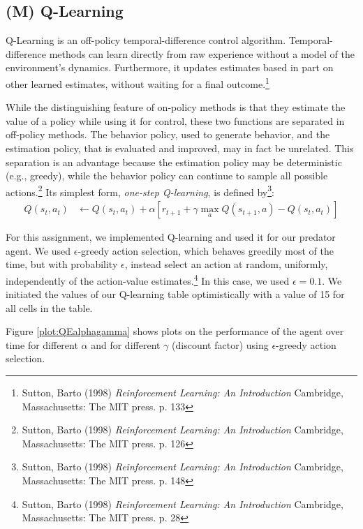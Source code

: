 \documentclass{article}
\begin{document}
\subsection{(M) Q-Learning}\label{sec:exercise1}
Q-Learning is an off-policy temporal-difference control algorithm. Temporal-difference methods can learn directly from raw experience without a model of the environment's dynamics. Furthermore, it updates estimates based in part on other learned estimates, without waiting for a final outcome.\footnote{Sutton, Barto (1998) \textit{Reinforcement Learning: An Introduction} Cambridge, Massachusetts: The MIT press. p. 133}

While the distinguishing feature of on-policy methods is that they estimate the value of a policy while using it for control, these two functions are separated in off-policy methods. The behavior policy, used to generate behavior, and the estimation policy, that is evaluated and improved, may in fact be unrelated. This separation is an advantage because the estimation policy may be deterministic (e.g., greedy), while the behavior policy can continue to sample all possible actions.\footnote{Sutton, Barto (1998) \textit{Reinforcement Learning: An Introduction} Cambridge, Massachusetts: The MIT press. p. 126} Its simplest form, \textit{one-step Q-learning}, is defined by\footnote{Sutton, Barto (1998) \textit{Reinforcement Learning: An Introduction} Cambridge, Massachusetts: The MIT press. p. 148}:
\begin{align*}
Q(s_t,a_t) & \leftarrow Q(s_t,a_t) + \alpha \left[ r_{t+1} + \gamma \displaystyle\max_a Q(s_{t+1},a) - Q(s_t,a_t) \right]
\end{align*}

For this assignment, we implemented Q-learning and used it for our predator agent. We used $\epsilon$-greedy action selection, which behaves greedily most of the time, but with probability $\epsilon$, instead select an action at random, uniformly, independently of the action-value estimates.\footnote{Sutton, Barto (1998) \textit{Reinforcement Learning: An Introduction} Cambridge, Massachusetts: The MIT press. p. 28} In this case, we used $\epsilon = 0.1$. We initiated the values of our Q-learning table optimistically with a value of 15 for all cells in the table.

Figure \ref{plot:QEalphagamma} shows plots on the performance of the agent over time for different $\alpha$ and for different $\gamma$ (discount factor) using $\epsilon$-greedy action selection.

 \label{plot:QEalphagamma}
\end{document}
